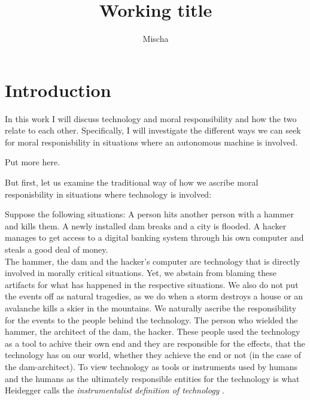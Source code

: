 \documentclass{article}
\title{Working title}
\author{Mischa}
\begin{document}
\begin{titlepage}
	\maketitle
\end{titlepage}
\tableofcontents
\newpage
\section{Introduction}

In this work I will discuss technology and moral responsibility and how the two
relate to each other. Specifically, I will investigate the different ways we can seek
for moral responisbility in situations where an autonomous machine is involved.

Put more here.

But first, let us examine the traditional way of how we ascribe moral
responisbility in situations where technology is involved:

Suppose the following situations: A person hits another person with a hammer and
kills them. A newly installed dam breaks and a city is flooded. A hacker manages
to get access to a digital banking system through his own computer and steals a good deal of money.\\

The hammer, the dam and the hacker's computer are technology that is directly
involved in morally critical situations. Yet, we abstain from blaming these
artifacts for what has happened in the respective situations. We also do not put
the events off as natural tragedies, as we do when a storm destroys a house or
an avalanche kills a skier in the mountains. We naturally ascribe the
responsibility for the events to the people behind the technology.
The person who wielded the hammer, the architect of the dam, the hacker.
These people used the technology as a tool to achive their own end and they are
responsible for the effects, that the technology has on our world, whether they
achieve the end or not (in the case of the dam-architect).
To view technology as tools or instruments used by humans and the humans as the ultimately
responsible entities for the technology is what Heidegger calls the \textit{instrumentalist
definition of technology} \cite{heidegger1977technology}. 

\cite[p.4]{heidegger1977technology}
\end{document}
